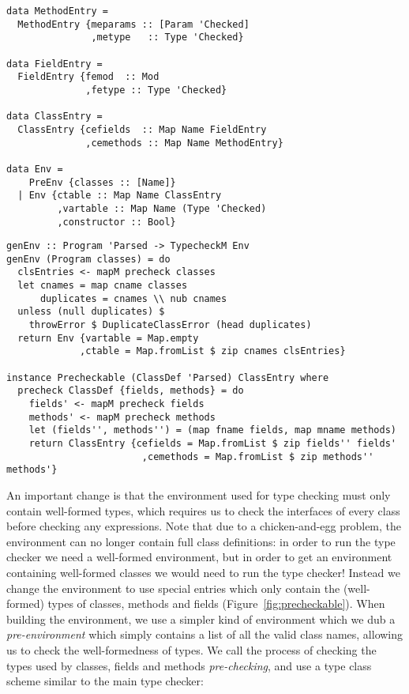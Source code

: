 \documentclass[sigplan,screen]{acmart}
\begin{document}
\begin{figure*}[t]
\begin{minipage}[t]{.46\linewidth}
\begin{lstlisting}[style=encore, numbers=none]
data MethodEntry =
  MethodEntry {meparams :: [Param 'Checked]
               ,metype   :: Type 'Checked}

data FieldEntry =
  FieldEntry {femod  :: Mod
              ,fetype :: Type 'Checked}

data ClassEntry =
  ClassEntry {cefields  :: Map Name FieldEntry
              ,cemethods :: Map Name MethodEntry}

data Env =
    PreEnv {classes :: [Name]}
  | Env {ctable :: Map Name ClassEntry
         ,vartable :: Map Name (Type 'Checked)
         ,constructor :: Bool}
\end{lstlisting}
\end{minipage}
%
\begin{minipage}[t]{.46\linewidth}
\begin{lstlisting}[style=encore, numbers=none]
genEnv :: Program 'Parsed -> TypecheckM Env
genEnv (Program classes) = do
  clsEntries <- mapM precheck classes
  let cnames = map cname classes
      duplicates = cnames \\ nub cnames
  unless (null duplicates) $
    throwError $ DuplicateClassError (head duplicates)
  return Env {vartable = Map.empty
             ,ctable = Map.fromList $ zip cnames clsEntries}

instance Precheckable (ClassDef 'Parsed) ClassEntry where
  precheck ClassDef {fields, methods} = do
    fields' <- mapM precheck fields
    methods' <- mapM precheck methods
    let (fields'', methods'') = (map fname fields, map mname methods)
    return ClassEntry {cefields = Map.fromList $ zip fields'' fields'
                        ,cemethods = Map.fromList $ zip methods'' methods'}
\end{lstlisting}
\end{minipage}
\caption{\label{fig:precheckable}Construction of an environment from the \emph{parsed} phase}
\end{figure*}

An important change is that the environment used for type checking
must only contain well-formed types,
%
which requires us to check the interfaces of every class before
checking any expressions.
%
Note that due to a chicken-and-egg problem, the environment
can no longer contain full class definitions: in order to
run the type checker we need a well-formed environment, but in
order to get an environment containing well-formed classes we
would need to run the type checker! Instead we change the
environment to use special entries which only contain the
(well-formed) types of classes, methods and fields (Figure~\ref{fig:precheckable}).
%
When building the environment, we use a simpler kind of
environment which we dub a \emph{pre-environment} which simply
contains a list of all the valid class names, allowing us to check
the well-formedness of types. We call the process of checking the
types used by classes, fields and methods \emph{pre-checking}, and
use a type class scheme similar to the main type checker:
\end{document}
